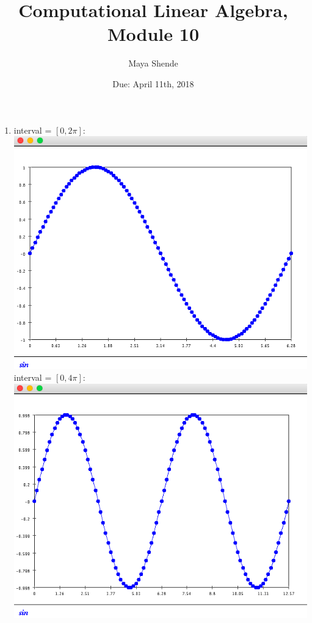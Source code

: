 \documentclass{article}
\title{Computational Linear Algebra, Module 10}
\author{Maya Shende}
\date{Due: April 11th, 2018}
\begin{document}
\maketitle

\begin{enumerate}

\item interval = $[0, 2\pi]$: \\
\includegraphics[scale=0.5]{exercise1_small_interval}\\
interval = $[0, 4\pi]$: \\
\includegraphics[scale=0.5]{exercise1_larger_interval}


\end{enumerate}
\end{document}
